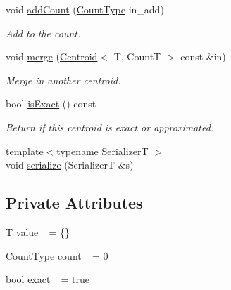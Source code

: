 \begin{DoxyCompactItemize}
void \hyperlink{structvt_1_1util_1_1adt_1_1detail_1_1_centroid_a781bd5bd78c178a2a4ee8c9a0c991d06}{add\+Count} (\hyperlink{structvt_1_1util_1_1adt_1_1detail_1_1_centroid_ac3815361e4f13eeb8b2863d2eb8db1dd}{Count\+Type} in\+\_\+add)
\begin{DoxyCompactList}\small\item\em Add to the count. \end{DoxyCompactList}\item 
void \hyperlink{structvt_1_1util_1_1adt_1_1detail_1_1_centroid_acad584e6798cbc7619d2b09f3f0cc06b}{merge} (\hyperlink{structvt_1_1util_1_1adt_1_1detail_1_1_centroid}{Centroid}$<$ T, CountT $>$ const \&in)
\begin{DoxyCompactList}\small\item\em Merge in another centroid. \end{DoxyCompactList}\item 
bool \hyperlink{structvt_1_1util_1_1adt_1_1detail_1_1_centroid_a07ab1f2d6f0497b8b98ce27672d9f0b2}{is\+Exact} () const
\begin{DoxyCompactList}\small\item\em Return if this centroid is exact or approximated. \end{DoxyCompactList}\item 
{\footnotesize template$<$typename SerializerT $>$ }\\void \hyperlink{structvt_1_1util_1_1adt_1_1detail_1_1_centroid_ad681c6c08ec1b8c48895b75ec370fa84}{serialize} (SerializerT \&s)
\end{DoxyCompactItemize}
\subsection*{Private Attributes}
\begin{DoxyCompactItemize}
\item 
T \hyperlink{structvt_1_1util_1_1adt_1_1detail_1_1_centroid_a17b351e747aba8aa88699a4d9137a692}{value\+\_\+} = \{\}
\item 
\hyperlink{structvt_1_1util_1_1adt_1_1detail_1_1_centroid_ac3815361e4f13eeb8b2863d2eb8db1dd}{Count\+Type} \hyperlink{structvt_1_1util_1_1adt_1_1detail_1_1_centroid_ac9df992e5ea17280b5d49bd0defa8c28}{count\+\_\+} = 0
\item 
bool \hyperlink{structvt_1_1util_1_1adt_1_1detail_1_1_centroid_a8564071b97ee50cf6ee90510d9f90aac}{exact\+\_\+} = true
\end{DoxyCompactItemize}
